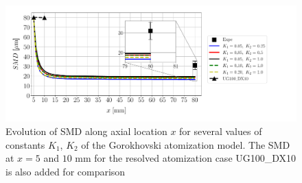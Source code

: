\begin{figure}[h!]
\centering
\includegraphics[scale=0.5]{./part2_developments/figures_ch6_lagrangian_JICF/apte_model_calibration_u_vw_lognorm/SMD_vs_x_apte_calibration_comparison}
\caption[Evolution of SMD along axial location $x$ for several values of the Gorokhovski atomization model]{Evolution of SMD along axial location $x$ for several values of constants $K_1$, $K_2$ of the Gorokhovski atomization model. The SMD at $x = 5$ and $10$ mm for the resolved atomization case UG100\_DX10 is also added for comparison}
\label{fig:SMD_vs_x_param_goro_calibration}
\end{figure}





